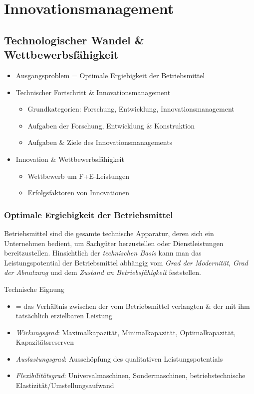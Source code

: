 \documentclass[11pt]{article}
\date{\today}
\title{}
\begin{document}
\tableofcontents

\section{Innovationsmanagement}
\label{sec:org96c96d7}
\subsection{Technologischer Wandel \& Wettbewerbsfähigkeit}
\label{sec:org57292ba}
\begin{itemize}
\item Ausgangsproblem = Optimale Ergiebigkeit der Betriebsmittel
\item Technischer Fortschritt \& Innovationsmanagement
\begin{itemize}
\item Grundkategorien: Forschung, Entwicklung, Innovationsmanagement
\item Aufgaben der Forschung, Entwicklung \& Konstruktion
\item Aufgaben \& Ziele des Innovationsmanagements
\end{itemize}
\item Innovation \& Wettbewerbsfähigkeit
\begin{itemize}
\item Wettbewerb um F+E-Leistungen
\item Erfolgsfaktoren von Innovationen
\end{itemize}
\end{itemize}

\subsubsection{Optimale Ergiebigkeit der Betriebsmittel}
\label{sec:org47b10c9}
Betriebsmittel sind die gesamte technische Apparatur, deren sich ein Unternehmen bedient, um Sachgüter herzustellen oder Dienstleistungen bereitzustellen. Hinsichtlich der \emph{technischen Basis} kann man das Leistungspotential der Betriebsmittel abhängig vom \emph{Grad der Modernität}, \emph{Grad der Abnutzung} und dem \emph{Zustand an Betriebsfähigkeit} feststellen.

Technische Eignung 
\begin{itemize}
\item = das Verhältnis zwischen der vom Betriebsmittel verlangten \& der mit ihm tatsächlich erzielbaren Leistung
\item \emph{Wirkungsgrad}: Maximalkapazität, Minimalkapazität, Optimalkapazität, Kapazitätsreserven
\item \emph{Auslastungsgrad}: Ausschöpfung des qualitativen Leistungspotentials
\item \emph{Flexibilitätsgrad}: Universalmaschinen, Sondermaschinen, betriebstechnische Elastizität/Umstellungsaufwand
\end{itemize}
\end{document}

